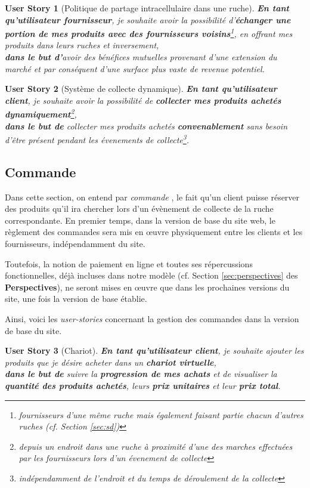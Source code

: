 \documentclass[a4paper,12pt]{report}
\theoremstyle{break}
\newtheorem*{userStory}{User Story}
\theoremstyle{break}
\theoremstyle{break}
\theoremstyle{break}
\theoremstyle{definition}
\theoremstyle{remark}
\begin{document}
\begin{userStory}[Politique de partage intracellulaire dans une ruche]
\textbf{En tant qu'utilisateur {\color{red}fournisseur}}, je souhaite avoir la possibilité d'\textbf{échanger une portion de mes produits avec des fournisseurs voisins}\footnote{fournisseurs d'une même ruche mais également faisant partie chacun d'autres ruches (cf. Section \ref{sec:sd})}, en offrant mes produits dans leurs ruches et inversement,\\
\indent
\textbf{dans le but d'}avoir des bénéfices mutuelles provenant d'une extension du marché et par conséquent d'une surface plus vaste de revenue potentiel.
\end{userStory}

\begin{userStory}[Système de collecte dynamique]
\textbf{En tant qu'utilisateur {\color{green}client}}, je souhaite avoir la possibilité de \textbf{collecter mes produits achetés dynamiquement}\footnote{depuis un endroit dans une ruche à proximité d'une des marches effectuées par les fournisseurs lors d'un évenement de collecte},\\
\indent
\textbf{dans le but de} collecter mes produits achetés \textbf{convenablement} sans besoin d'être présent pendant les évenements de collecte\footnote{indépendamment de l'endroit et du temps de déroulement de la collecte}.
\end{userStory}

\subsection{Commande}
Dans cette section, on entend par \og \textit{commande} \fg , le fait qu'un client puisse réserver des produits qu'il ira chercher lors d'un évènement de collecte de la ruche correspondante. En premier temps, dans la version de base du site web, le règlement des commandes sera mis en \oe{}uvre physiquement entre les clients et les fournisseurs, indépendamment du site.

Toutefois, la notion de paiement en ligne et toutes ses répercussions fonctionnelles, déjà incluses dans notre modèle (cf. Section \ref{sec:perspectives} des \textbf{Perspectives}), ne seront mises en \oe{}uvre que dans les prochaines versions du site, une fois la version de base établie.

Ainsi, voici les \textit{user-stories} concernant la gestion des commandes dans la version de base du site.

\begin{userStory}[Chariot]
\textbf{En tant qu'utilisateur {\color{green}client}}, je souhaite ajouter les produits que je désire acheter dans un \textbf{chariot virtuelle},\\
\indent
\textbf{dans le but de} suivre la \textbf{progression de mes achats} et de visualiser la \textbf{quantité des produits achetés}, leurs \textbf{prix unitaires} et leur \textbf{prix total}.
\end{userStory}
\end{document}
